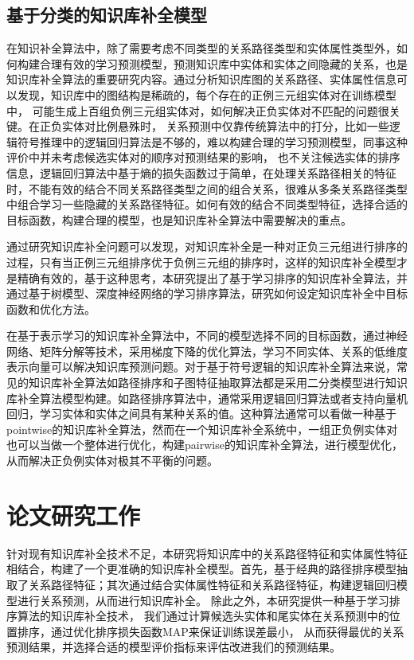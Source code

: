 \subsection{基于分类的知识库补全模型}
在知识补全算法中，除了需要考虑不同类型的关系路径类型和实体属性类型外，如何构建合理有效的学习预测模型，预测知识库中实体和实体之间隐藏的关系，也是知识库补全算法的重要研究内容。通过分析知识库图的关系路径、实体属性信息可以发现，知识库中的图结构是稀疏的，每个存在的正例三元组实体对在训练模型中，
可能生成上百组负例三元组实体对，如何解决正负实体对不匹配的问题很关键。在正负实体对比例悬殊时，
关系预测中仅靠传统算法中的打分，比如一些逻辑符号推理中的逻辑回归算法是不够的，难以构建合理的学习预测模型，同事这种评价中并未考虑候选实体对的顺序对预测结果的影响，
也不关注候选实体的排序信息，逻辑回归算法中基于熵的损失函数过于简单，在处理关系路径相关的特征时，不能有效的结合不同关系路径类型之间的组合关系，很难从多条关系路径类型中组合学习一些隐藏的关系路径特征。如何有效的结合不同类型特征，选择合适的目标函数，构建合理的模型，也是知识库补全算法中需要解决的重点。

通过研究知识库补全问题可以发现，对知识库补全是一种对正负三元组进行排序的过程，只有当正例三元组排序优于负例三元组的排序时，这样的知识库补全模型才是精确有效的，基于这种思考，本研究提出了基于学习排序的知识库补全算法，并通过基于树模型、深度神经网络的学习排序算法，研究如何设定知识库补全中目标函数和优化方法。

在基于表示学习的知识库补全算法中，不同的模型选择不同的目标函数，通过神经网络、矩阵分解等技术，采用梯度下降的优化算法，学习不同实体、关系的低维度表示向量可以解决知识库预测问题。对于基于符号逻辑的知识库补全算法来说，常见的知识库补全算法如路径排序和子图特征抽取算法都是采用二分类模型进行知识库补全算法模型构建。如路径排序算法中，通常采用逻辑回归算法或者支持向量机回归，学习实体和实体之间具有某种关系的值。这种算法通常可以看做一种基于pointwise的知识库补全算法，然而在一个知识库补全系统中，一组正负例实体对也可以当做一个整体进行优化，构建pairwise的知识库补全算法，进行模型优化，从而解决正负例实体对极其不平衡的问题。

\section{论文研究工作}

针对现有知识库补全技术不足，本研究将知识库中的关系路径特征和实体属性特征相结合，构建了一个更准确的知识库补全模型。首先，基于经典的路径排序模型抽取了关系路径特征；其次通过结合实体属性特征和关系路径特征，构建逻辑回归模型进行关系预测，从而进行知识库补全。
除此之外，本研究提供一种基于学习排序算法的知识库补全技术，
我们通过计算候选头实体和尾实体在关系预测中的位置排序，通过优化排序损失函数MAP来保证训练误差最小，
从而获得最优的关系预测结果，并选择合适的模型评价指标来评估改进我们的预测结果。

